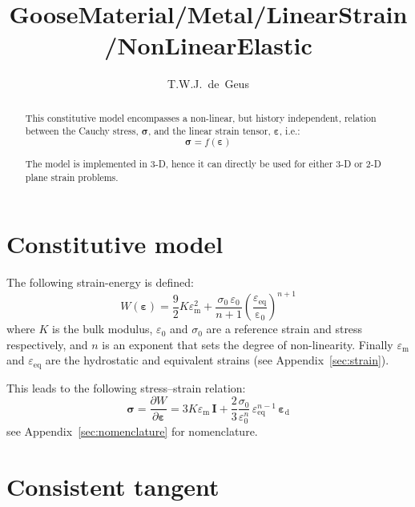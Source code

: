 \documentclass[times,namecite]{goose-article}
\title{%
  GooseMaterial/Metal/LinearStrain/NonLinearElastic
}
\author{T.W.J.~de~Geus}
\begin{document}
\maketitle

\begin{abstract}
This constitutive model encompasses a non-linear, but history independent, relation between the Cauchy stress, $\bm{\sigma}$, and the linear strain tensor, $\bm{\varepsilon}$, i.e.:
\begin{equation*}
  \bm{\sigma} = f \left( \bm{\varepsilon} \right)
\end{equation*}

The model is implemented in 3-D, hence it can directly be used for either 3-D or 2-D plane strain problems.
\end{abstract}


\setcounter{tocdepth}{2}
\tableofcontents

\vfill\newpage
\section{Constitutive model}

The following strain-energy is defined:
%
\begin{equation}
  W ( \bm{\varepsilon} )
  = \frac{9}{2} K \varepsilon_\mathrm{m}^2
  + \frac{ \sigma_0 \, \varepsilon_0 }{ n+1 }
    \left( \frac{\varepsilon_\mathrm{eq}}{\mathrm{\varepsilon_0}} \right)^{n+1}
\end{equation}
%
where $K$ is the bulk modulus, $\varepsilon_0$ and $\sigma_0$ are a reference strain and stress respectively, and $n$ is an exponent that sets the degree of non-linearity. Finally $\varepsilon_\mathrm{m}$ and $\varepsilon_\mathrm{eq}$ are the hydrostatic and equivalent strains (see Appendix~\ref{sec:strain}).

This leads to the following stress--strain relation:
%
\begin{equation}
\label{eq:stress}
  \bm{\sigma}
  = \frac{\partial W}{\partial \bm{\varepsilon}}
  = 3 K \varepsilon_\mathrm{m} \, \bm{I}
  + \frac{2}{3} \frac{\sigma_0}{\varepsilon_0^n} \,
    \varepsilon_\mathrm{eq}^{n-1} \, \bm{\varepsilon}_\mathrm{d}
\end{equation}
%
see Appendix~\ref{sec:nomenclature} for nomenclature.

\section{Consistent tangent}
\end{document}
